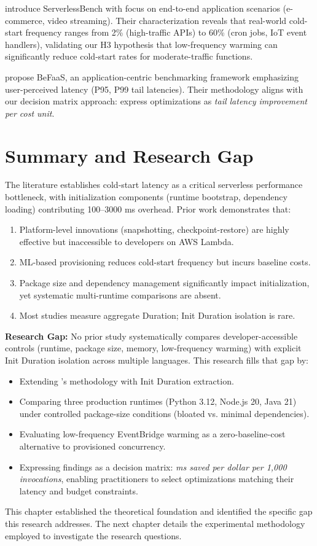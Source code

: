 \citet{yu2020serverlessbench} introduce ServerlessBench with focus on end-to-end application scenarios (e-commerce, video streaming). Their characterization reveals that real-world cold-start frequency ranges from 2\% (high-traffic APIs) to 60\% (cron jobs, IoT event handlers), validating our H3 hypothesis that low-frequency warming can significantly reduce cold-start rates for moderate-traffic functions.

\citet{grambow2021befaas} propose BeFaaS, an application-centric benchmarking framework emphasizing user-perceived latency (P95, P99 tail latencies). Their methodology aligns with our decision matrix approach: express optimizations as \textit{tail latency improvement per cost unit}.

\section{Summary and Research Gap}

The literature establishes cold-start latency as a critical serverless performance bottleneck, with initialization components (runtime bootstrap, dependency loading) contributing 100–3000 ms overhead. Prior work demonstrates that:

\begin{enumerate}
    \item Platform-level innovations (snapshotting, checkpoint-restore) are highly effective but inaccessible to developers on AWS Lambda.
    \item ML-based provisioning reduces cold-start frequency but incurs baseline costs.
    \item Package size and dependency management significantly impact initialization, yet systematic multi-runtime comparisons are absent.
    \item Most studies measure aggregate Duration; Init Duration isolation is rare.
\end{enumerate}

\textbf{Research Gap:} No prior study systematically compares developer-accessible controls (runtime, package size, memory, low-frequency warming) with explicit Init Duration isolation across multiple languages. This research fills that gap by:

\begin{itemize}
    \item Extending \citet{bluemke2025ijet}'s methodology with Init Duration extraction.
    \item Comparing three production runtimes (Python 3.12, Node.js 20, Java 21) under controlled package-size conditions (bloated vs. minimal dependencies).
    \item Evaluating low-frequency EventBridge warming as a zero-baseline-cost alternative to provisioned concurrency.
    \item Expressing findings as a decision matrix: \textit{ms saved per dollar per 1,000 invocations}, enabling practitioners to select optimizations matching their latency and budget constraints.
\end{itemize}

This chapter established the theoretical foundation and identified the specific gap this research addresses. The next chapter details the experimental methodology employed to investigate the research questions. 
